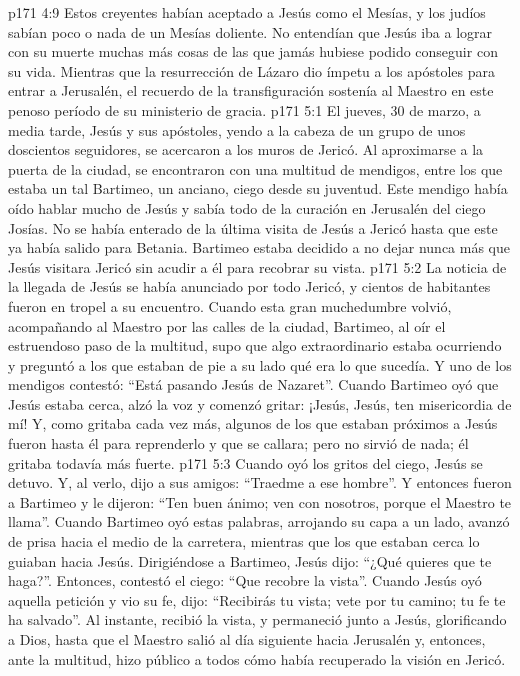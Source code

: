 \vs p171 4:9 Estos creyentes habían aceptado a Jesús como el Mesías, y los judíos sabían poco o nada de un Mesías doliente. No entendían que Jesús iba a lograr con su muerte muchas más cosas de las que jamás hubiese podido conseguir con su vida. Mientras que la resurrección de Lázaro dio ímpetu a los apóstoles para entrar a Jerusalén, el recuerdo de la transfiguración sostenía al Maestro en este penoso período de su ministerio de gracia.
\vs p171 5:1 El jueves, 30 de marzo, a media tarde, Jesús y sus apóstoles, yendo a la cabeza de un grupo de unos doscientos seguidores, se acercaron a los muros de Jericó. Al aproximarse a la puerta de la ciudad, se encontraron con una multitud de mendigos, entre los que estaba un tal Bartimeo, un anciano, ciego desde su juventud. Este mendigo había oído hablar mucho de Jesús y sabía todo de la curación en Jerusalén del ciego Josías. No se había enterado de la última visita de Jesús a Jericó hasta que este ya había salido para Betania. Bartimeo estaba decidido a no dejar nunca más que Jesús visitara Jericó sin acudir a él para recobrar su vista.
\vs p171 5:2 La noticia de la llegada de Jesús se había anunciado por todo Jericó, y cientos de habitantes fueron en tropel a su encuentro. Cuando esta gran muchedumbre volvió, acompañando al Maestro por las calles de la ciudad, Bartimeo, al oír el estruendoso paso de la multitud, supo que algo extraordinario estaba ocurriendo y preguntó a los que estaban de pie a su lado qué era lo que sucedía. Y uno de los mendigos contestó: “Está pasando Jesús de Nazaret”. Cuando Bartimeo oyó que Jesús estaba cerca, alzó la voz y comenzó gritar: ¡Jesús, Jesús, ten misericordia de mí! Y, como gritaba cada vez más, algunos de los que estaban próximos a Jesús fueron hasta él para reprenderlo y que se callara; pero no sirvió de nada; él gritaba todavía más fuerte.
\vs p171 5:3 Cuando oyó los gritos del ciego, Jesús se detuvo. Y, al verlo, dijo a sus amigos: “Traedme a ese hombre”. Y entonces fueron a Bartimeo y le dijeron: “Ten buen ánimo; ven con nosotros, porque el Maestro te llama”. Cuando Bartimeo oyó estas palabras, arrojando su capa a un lado, avanzó de prisa hacia el medio de la carretera, mientras que los que estaban cerca lo guiaban hacia Jesús. Dirigiéndose a Bartimeo, Jesús dijo: “¿Qué quieres que te haga?”. Entonces, contestó el ciego: “Que recobre la vista”. Cuando Jesús oyó aquella petición y vio su fe, dijo: “Recibirás tu vista; vete por tu camino; tu fe te ha salvado”. Al instante, recibió la vista, y permaneció junto a Jesús, glorificando a Dios, hasta que el Maestro salió al día siguiente hacia Jerusalén y, entonces, ante la multitud, hizo público a todos cómo había recuperado la visión en Jericó.
